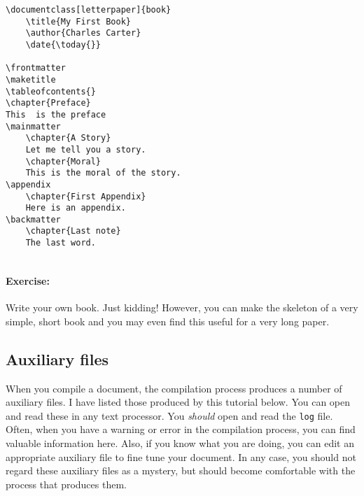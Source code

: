         \begin{verbatim}
\documentclass[letterpaper]{book}
	\title{My First Book}
	\author{Charles Carter}
	\date{\today{}}

\frontmatter
\maketitle
\tableofcontents{}
\chapter{Preface}
This  is the preface
\mainmatter
    \chapter{A Story}
    Let me tell you a story.
    \chapter{Moral}
    This is the moral of the story. 
\appendix
    \chapter{First Appendix}
    Here is an appendix.
\backmatter
    \chapter{Last note}
    The last word.
    
        \end{verbatim}

        \paragraph{Exercise:} Write your own book. Just kidding! However, you can make the skeleton of a very simple, short book and you may even find this useful for a very long paper.

        \subsection{Auxiliary files}
        \label{Auxiliary files}
        
        When you compile a \Lx{} document, the compilation process produces a number of auxiliary files. I have listed those produced by this tutorial below. You can open and read these in any text processor. You \textit{should} open and read the \texttt{log} file. Often, when you have a warning or error in the compilation process, you can find valuable information here. Also, if you know what you are doing, you can edit an appropriate auxiliary file to fine tune your document. In any case, you should not regard these auxiliary files as a mystery, but should become comfortable with the process that produces them.

